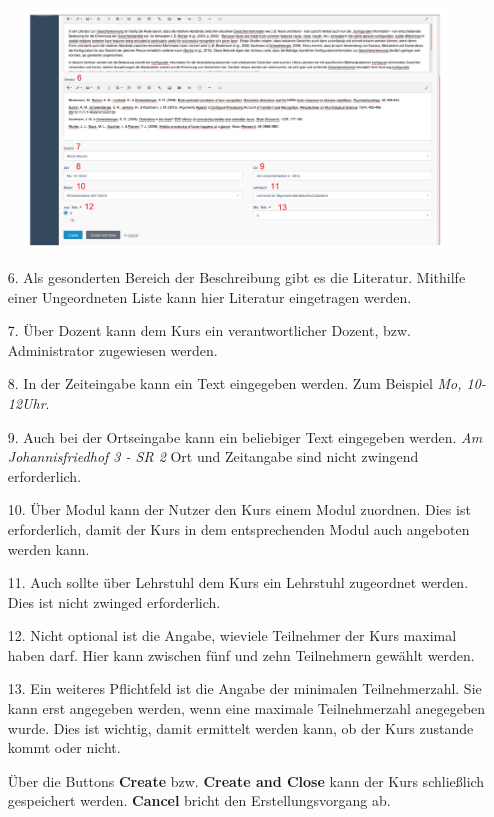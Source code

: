 	\begin{figure}
		\centering
		\includegraphics[scale=0.5]{backend/img/create_course_2.pdf}
	\end{figure}
    \begin{enumerate}
     \item[6.] Als gesonderten Bereich der Beschreibung gibt es die Literatur. Mithilfe einer Ungeordneten Liste kann hier Literatur eingetragen werden.
     \item[7.] Über Dozent kann dem Kurs ein verantwortlicher Dozent, bzw. Administrator zugewiesen werden.
     \item[8.] In der Zeiteingabe kann ein Text eingegeben werden. Zum Beispiel \textit{Mo, 10-12Uhr}. 
     \item[9.] Auch bei der Ortseingabe kann ein beliebiger Text eingegeben werden. \textit{Am Johannisfriedhof 3 - SR 2}
	       Ort und Zeitangabe sind nicht zwingend erforderlich.
     \item[10.]Über Modul kann der Nutzer den Kurs einem Modul zuordnen. Dies ist erforderlich, damit der Kurs in dem entsprechenden Modul auch angeboten werden kann.
     \item[11.]Auch sollte über Lehrstuhl dem Kurs ein Lehrstuhl zugeordnet werden. Dies ist nicht zwinged erforderlich.
     \item[12.]Nicht optional ist die Angabe, wieviele Teilnehmer der Kurs maximal haben darf. Hier kann zwischen fünf und zehn Teilnehmern gewählt werden.
     \item[13.]Ein weiteres Pflichtfeld ist die Angabe der minimalen Teilnehmerzahl. Sie kann erst angegeben werden, wenn eine maximale Teilnehmerzahl anegegeben wurde.
	       Dies ist wichtig, damit ermittelt werden kann, ob der Kurs zustande kommt oder nicht.
     \item[]Über die Buttons \textbf{Create} bzw. \textbf{Create and Close} kann der Kurs schließlich gespeichert werden. \textbf{Cancel} bricht den Erstellungsvorgang ab.
    \end{enumerate}

